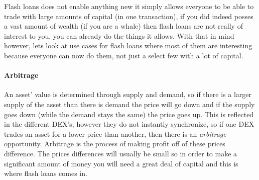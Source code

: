 Flash loans does not enable anything new it simply allows everyone to be able to trade with large amounts of capital (in one transaction), if you did indeed posses a vast amount of wealth (if you are a whale) then flash loans are not really of interest to you, you can already do the things it allows. With that in mind however, lets look at use cases for flash loans where most of them are interesting because everyone can now do them, not just a select few with a lot of capital.

\paragraph{Arbitrage} An asset' value is determined through supply and demand, so if there is a larger supply of the asset than there is demand the price will go down and if the supply goes down (while the demand stays the same) the price goes up. This is reflected in the different DEX's, however they do not instantly synchronize, so if one DEX trades an asset for a lower price than another, then there is an \textit{arbitrage} opportunity. Arbitrage is the process of making profit off of these prices difference. The prices differences will usually be small so in order to make a significant amount of money you will need a great deal of capital and this is where flash loans comes in. 